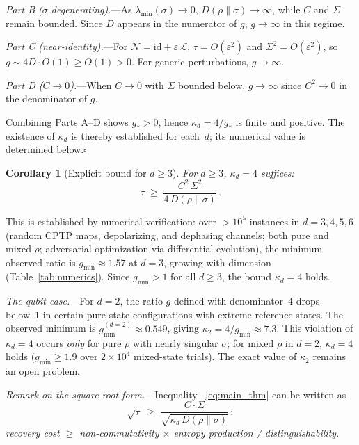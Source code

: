 \documentclass[prl,twocolumn,superscriptaddress,longbibliography,floatfix]{revtex4-2}
\newtheorem{corollary}[theorem]{Corollary}
\newcommand{\id}{\mathrm{id}}
\newcommand{\chan}{\mathcal{N}}
\newcommand{\tauasym}{\tau}
\newcommand{\kd}{\kappa_d}
\begin{document}
\emph{Part B ($\sigma$ degenerating).}---As
$\lambda_{\min}(\sigma) \to 0$,
$D(\rho\|\sigma) \to \infty$, while $C$ and $\Sigma$
remain bounded.
Since $D$ appears in the numerator of $g$,
$g \to \infty$ in this regime.

\emph{Part C (near-identity).}---For
$\chan = \id + \varepsilon\,\mathcal{L}$,
$\tauasym = O(\varepsilon^2)$ and
$\Sigma^2 = O(\varepsilon^2)$, so
$g \sim 4D \cdot O(1) \geq O(1) > 0$.
For generic perturbations, $g \to \infty$.

\emph{Part D ($C \to 0$).}---When $C \to 0$ with
$\Sigma$ bounded below, $g \to \infty$ since
$C^2 \to 0$ in the denominator of $g$.

Combining Parts A--D shows $g_* > 0$, hence
$\kd = 4/g_*$ is finite and positive.
The existence of $\kd$ is thereby established for
each~$d$; its numerical value is determined
below.\hfill$\square$

\begin{corollary}[Explicit bound for $d \geq 3$]
\label{cor:d3}
For $d \geq 3$, $\kd = 4$ suffices:
\begin{equation}
\tauasym \;\geq\; \frac{C^2\, \Sigma^2}
  {4\, D(\rho\|\sigma)}\,.
\label{eq:d3_bound}
\end{equation}
\end{corollary}

This is established by numerical verification: over
$>10^5$ instances in $d = 3,4,5,6$ (random CPTP maps,
depolarizing, and dephasing channels; both pure and
mixed $\rho$; adversarial optimization via
differential evolution), the minimum observed ratio is
$g_{\min} \approx 1.57$ at $d = 3$, growing with
dimension (Table~\ref{tab:numerics}).
Since $g_{\min} > 1$ for all $d \geq 3$, the bound
$\kd = 4$ holds.

\emph{The qubit case.}---For $d = 2$, the ratio $g$
defined with denominator~$4$ drops below~1
in certain pure-state configurations with extreme
reference states. The observed minimum is
$g_{\min}^{(d=2)} \approx 0.549$, giving
$\kappa_2 = 4/g_{\min} \approx 7.3$.
This violation of $\kd = 4$ occurs \emph{only} for
pure $\rho$ with nearly singular $\sigma$; for
mixed $\rho$ in $d = 2$, $\kd = 4$ holds
($g_{\min} \geq 1.9$ over $2\times 10^4$ mixed-state
trials).
The exact value of $\kappa_2$ remains an open problem.

\emph{Remark on the square root form.}---Inequality~%
\eqref{eq:main_thm} can be written as
\begin{equation}
\sqrt{\tauasym} \;\geq\;
\frac{C \cdot \Sigma}{\sqrt{\kd\,D(\rho\|\sigma)}}\,:
\label{eq:sqrt_form}
\end{equation}
\emph{recovery cost $\geq$ non-commutativity $\times$
entropy production / distinguishability.}
\end{document}
